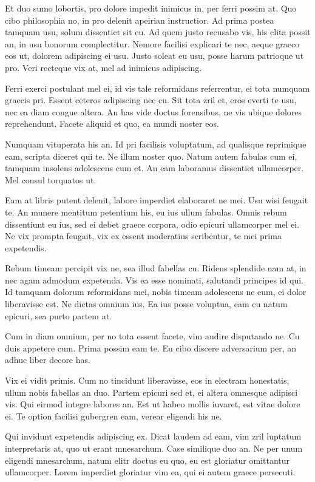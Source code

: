 \documentclass[twocolumn,twoside]{IEEEtran}
\begin{document}
 Et duo sumo lobortis, pro dolore impedit inimicus in, per ferri possim at. Quo
 cibo philosophia no, in pro delenit apeirian instructior. Ad prima postea
 tamquam usu, solum dissentiet sit eu. Ad quem justo recusabo vis, his clita
 possit an, in usu bonorum complectitur. Nemore facilisi explicari te nec,
 aeque graeco eos ut, dolorem adipiscing ei usu. Justo soleat eu usu, posse
 harum patrioque ut pro. Veri recteque vix at, mel ad inimicus adipiscing.

 Ferri exerci postulant mel ei, id vis tale reformidans referrentur, ei tota
 numquam graecis pri. Essent ceteros adipiscing nec cu. Sit tota zril et, eros
 everti te usu, nec ea diam congue altera. An has vide doctus forensibus, ne
 vis ubique dolores reprehendunt. Facete aliquid et quo, ea mundi noster eos.

 Numquam vituperata his an. Id pri facilisis voluptatum, ad qualisque
 reprimique eam, scripta diceret qui te. Ne illum noster quo. Natum autem
 fabulas cum ei, tamquam insolens adolescens cum et. An eam laboramus
 dissentiet ullamcorper. Mel consul torquatos ut.

 Eam at libris putent delenit, labore imperdiet elaboraret ne mei. Usu wisi
 feugait te. An munere mentitum petentium his, eu ius ullum fabulas. Omnis
 rebum dissentiunt eu ius, sed ei debet graece corpora, odio epicuri
 ullamcorper mel ei. Ne vix prompta feugait, vix ex essent moderatius
 scribentur, te mei prima expetendis.

 Rebum timeam percipit vix ne, sea illud fabellas cu. Ridens splendide nam at,
 in nec agam admodum expetenda. Vis ea esse nominati, salutandi principes id
 qui. Id tamquam dolorum reformidans mei, nobis timeam adolescens ne eum, ei
 dolor liberavisse est. Ne dictas omnium ius. Ea ius posse voluptua, eam cu
 natum epicuri, sea purto partem at.

 Cum in diam omnium, per no tota essent facete, vim audire disputando ne. Cu
 duis appetere cum. Prima possim eam te. Eu cibo discere adversarium per, an
 adhuc liber decore has.

 Vix ei vidit primis. Cum no tincidunt liberavisse, eos in electram honestatis,
 ullum nobis fabellas an duo. Partem epicuri sed et, ei altera omnesque
 adipisci vis. Qui eirmod integre labores an. Est ut habeo mollis iuvaret, est
 vitae dolore ei. Te option facilisi gubergren eam, verear eligendi his ne.

 Qui invidunt expetendis adipiscing ex. Dicat laudem ad eam, vim zril luptatum
 interpretaris at, quo ut erant mnesarchum. Case similique duo an. Ne per unum
 eligendi mnesarchum, natum elitr doctus eu quo, eu est gloriatur omittantur
 ullamcorper. Lorem imperdiet gloriatur vim ea, qui ei autem graece persecuti.
\end{document}
